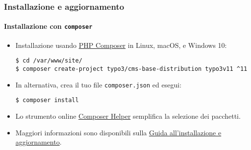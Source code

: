 %

\begin{frame}[fragile]
	\frametitle{Installazione e aggiornamento}
	\framesubtitle{Installazione con \texttt{composer}}


	\begin{itemize}
		\item Installazione usando \href{https://getcomposer.org}{PHP Composer} in Linux, macOS, e Windows 10:
\begin{lstlisting}
$ cd /var/www/site/
$ composer create-project typo3/cms-base-distribution typo3v11 ^11
\end{lstlisting}

		\item In alternativa, crea il tuo file \texttt{composer.json} ed esegui:
\begin{lstlisting}
$ composer install
\end{lstlisting}

		\item Lo strumento online \href{https://get.typo3.org/misc/composer/helper}{Composer Helper}
			semplifica la selezione dei pacchetti.

		\item Maggiori informazioni sono disponibili sulla
			\href{https://docs.typo3.org/m/typo3/guide-installation/master/en-us/}{Guida all'installazione e aggiornamento}.

	\end{itemize}
\end{frame}


